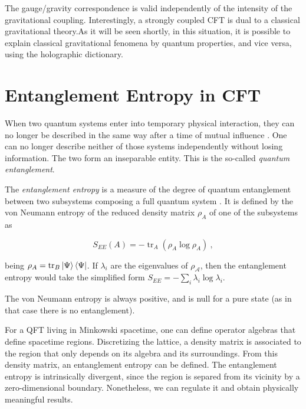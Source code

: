 \documentclass[twocolumn]{revtex4}
\providecommand{\eq}[2]{
    \begin{equation}
        #2
    \label{eq:#1}
    \end{equation}
}
\DeclareMathOperator{\calA}{\mathcal{A}}
\DeclareMathOperator{\tr}{tr}
\begin{document}
The gauge/gravity correspondence is valid independently of the intensity of the gravitational coupling. Interestingly, a strongly coupled CFT is dual to a classical gravitational theory.As it will be seen shortly, in this situation, it is possible to explain classical gravitational fenomena by quantum properties, and vice versa, using the holographic dictionary.


\section{Entanglement Entropy in CFT} \label{s:EE_CFT}

When two quantum systems enter into temporary physical interaction, they can no longer be described in the same way after a time of mutual influence \cite{schrodinger_discussion_1935}. One can no longer describe neither of those systems independently without losing information. The two form an inseparable entity. This is the so-called \textit{quantum entanglement}.

The \textit{entanglement entropy} is a measure of the degree of quantum entanglement between two subsystems composing a full quantum system \cite{nishioka_entanglement_2018}. It is defined by the von Neumann entropy of the reduced density matrix $\rho_A$ of one of the subsystems as
\eq{EE}{
    S_{EE}(A) = - \tr_A ( \rho_A \log \rho_A ) \ ,
}
being $\rho_A = \tr_B \ket{\Psi}\bra{\Psi}$. If $\lambda_i$ are the eigenvalues of $\rho_{\calA}$, then the entanglement entropy would take the simplified form $S_{EE} = - \sum_i \lambda_i \log \lambda_i$.

The von Neumann entropy is always positive, and is null for a pure state (as in that case there is no entanglement).

For a QFT living in Minkowski spacetime, one can define operator algebras that define spacetime regions. Discretizing the lattice, a density matrix is associated to the region that only depends on its algebra and its surroundings. From this density matrix, an entanglement entropy can be defined. The entanglement entropy is intrinsically divergent, since the region is separed from its vicinity by a zero-dimensional boundary. Nonetheless, we can regulate it and obtain physically meaningful results.
\end{document}
